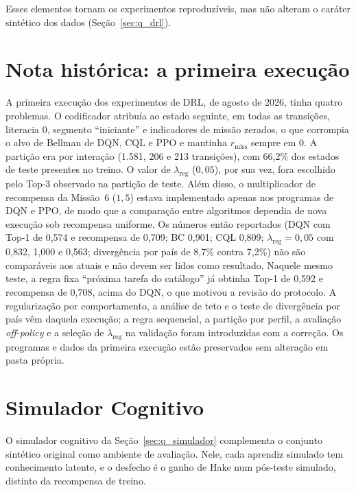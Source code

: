 \noindent Esses elementos tornam os experimentos reproduzíveis, mas não alteram o caráter sintético dos dados (Seção~\ref{sec:q_drl}).

\section*{Nota histórica: a primeira execução}

A primeira execução dos experimentos de DRL, de agosto de 2026, tinha quatro problemas. O codificador atribuía ao estado seguinte, em todas as transições, literacia 0, segmento ``iniciante'' e indicadores de missão zerados, o que corrompia o alvo de Bellman de DQN, CQL e PPO e mantinha $r_{\text{miss}}$ sempre em 0. A partição era por interação (1.581, 206 e 213 transições), com 66,2\% dos estados de teste presentes no treino. O valor de $\lambda_{\text{reg}}$ ($0{,}05$), por sua vez, fora escolhido pelo Top-3 observado na partição de teste. Além disso, o multiplicador de recompensa da Missão~6 ($1{,}5$) estava implementado apenas nos programas de DQN e PPO, de modo que a comparação entre algoritmos dependia de nova execução sob recompensa uniforme. Os números então reportados (DQN com Top-1 de 0,574 e recompensa de 0,709; BC 0,901; CQL 0,809; $\lambda_{\text{reg}} = 0{,}05$ com 0,832, 1,000 e 0,563; divergência por país de 8,7\% contra 7,2\%) não são comparáveis aos atuais e não devem ser lidos como resultado. Naquele mesmo teste, a regra fixa ``próxima tarefa do catálogo'' já obtinha Top-1 de 0,592 e recompensa de 0,708, acima do DQN, o que motivou a revisão do protocolo. A regularização por comportamento, a análise de teto e o teste de divergência por país vêm daquela execução; a regra sequencial, a partição por perfil, a avaliação \textit{off-policy} e a seleção de $\lambda_{\text{reg}}$ na validação foram introduzidas com a correção. Os programas e dados da primeira execução estão preservados sem alteração em pasta própria.

\section*{Simulador Cognitivo}
\label{sec:apendice_simulador}

O simulador cognitivo da Seção~\ref{sec:q_simulador} complementa o conjunto sintético original como ambiente de avaliação. Nele, cada aprendiz simulado tem conhecimento latente, e o desfecho é o ganho de Hake num pós-teste simulado, distinto da recompensa de treino.

